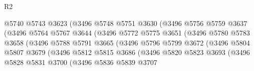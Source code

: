 \begin{lexlean}{R2}
\begin{coremodule}
                                  @5740
                                  @5743
                                  @3623
                                  (@3496
                                    @5748
                                    @5751
                                    @3630
                                    (@3496
                                      @5756
                                      @5759
                                      @3637
                                      (@3496
                                        @5764
                                        @5767
                                        @3644
                                        (@3496
                                          @5772
                                          @5775
                                          @3651
                                          (@3496
                                            @5780
                                            @5783
                                            @3658
                                            (@3496
                                              @5788
                                              @5791
                                              @3665
                                              (@3496
                                                @5796
                                                @5799
                                                @3672
                                                (@3496
                                                  @5804
                                                  @5807
                                                  @3679
                                                  (@3496
                                                    @5812
                                                    @5815
                                                    @3686
                                                    (@3496
                                                      @5820
                                                      @5823
                                                      @3693
                                                      (@3496
                                                        @5828
                                                        @5831
                                                        @3700
                                                        (@3496
                                                          @5836
                                                          @5839
                                                          @3707

\end{coremodule}
\end{lexlean}
